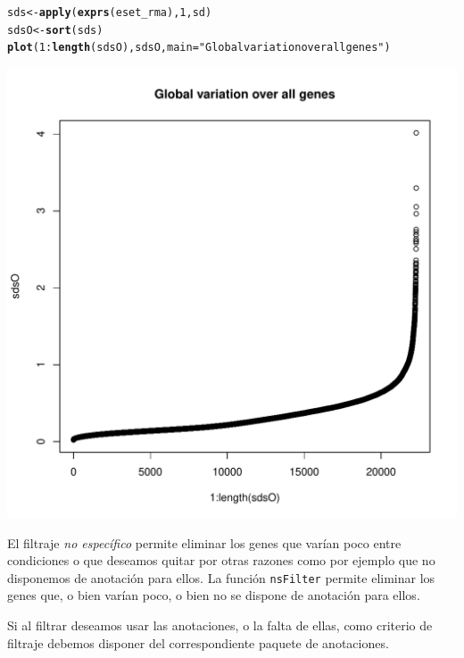 \documentclass[a4paper]{article}\usepackage[]{graphicx}\usepackage[]{color}
\makeatletter
\def\maxwidth{ %
  \ifdim\Gin@nat@width>\linewidth
    \linewidth
  \else
    \Gin@nat@width
  \fi
}
\newcommand{\hlnum}[1]{\textcolor[rgb]{0.686,0.059,0.569}{#1}}%
\newcommand{\hlstr}[1]{\textcolor[rgb]{0.192,0.494,0.8}{#1}}%
\newcommand{\hlopt}[1]{\textcolor[rgb]{0,0,0}{#1}}%
\newcommand{\hlstd}[1]{\textcolor[rgb]{0.345,0.345,0.345}{#1}}%
\newcommand{\hlkwb}[1]{\textcolor[rgb]{0.69,0.353,0.396}{#1}}%
\newcommand{\hlkwc}[1]{\textcolor[rgb]{0.333,0.667,0.333}{#1}}%
\newcommand{\hlkwd}[1]{\textcolor[rgb]{0.737,0.353,0.396}{\textbf{#1}}}%
\newenvironment{kframe}{%
 \def\at@end@of@kframe{}%
 \ifinner\ifhmode%
  \def\at@end@of@kframe{\end{minipage}}%
  \begin{minipage}{\columnwidth}%
 \fi\fi%
 \def\FrameCommand##1{\hskip\@totalleftmargin \hskip-\fboxsep
 \colorbox{shadecolor}{##1}\hskip-\fboxsep
     \hskip-\linewidth \hskip-\@totalleftmargin \hskip\columnwidth}%
 \MakeFramed {\advance\hsize-\width
   \@totalleftmargin\z@ \linewidth\hsize
   \@setminipage}}%
 {\par\unskip\endMakeFramed%
 \at@end@of@kframe}
\newenvironment{knitrout}{}{} %
\makeatother
\begin{document}
\begin{knitrout}
\color{fgcolor}\begin{kframe}
\begin{alltt}
\hlstd{sds} \hlkwb{<-} \hlkwd{apply} \hlstd{(}\hlkwd{exprs}\hlstd{(eset_rma),} \hlnum{1}\hlstd{, sd)}
\hlstd{sdsO}\hlkwb{<-} \hlkwd{sort}\hlstd{(sds)}
\hlkwd{plot}\hlstd{(}\hlnum{1}\hlopt{:}\hlkwd{length}\hlstd{(sdsO), sdsO,} \hlkwc{main}\hlstd{=}\hlstr{"Global variation over all genes"}\hlstd{)}
\end{alltt}
\end{kframe}
\includegraphics[width=\maxwidth]{images/graficvariancePlot-1} 

\end{knitrout}


El filtraje \emph{no específico} permite eliminar los genes que varían poco entre condiciones o que deseamos quitar por otras razones como por ejemplo que no disponemos de anotación para ellos. La función \texttt{nsFilter} permite eliminar los genes que, o bien varían poco, o bien no se dispone de anotación para ellos.

Si al filtrar deseamos usar las anotaciones, o la falta de ellas, como criterio de filtraje debemos disponer del correspondiente paquete de anotaciones.
\end{document}
